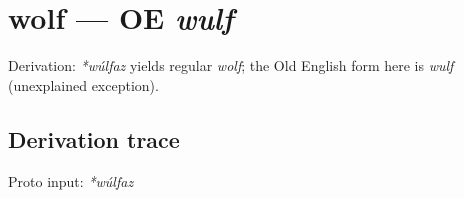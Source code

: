 \documentclass[
  british,
  a4paper,
  openany]{book}
\providecommand{\texorpdfstring}[2]{#1}
\begin{document}
\section{\texorpdfstring{wolf --- OE
\emph{wulf}}{wolf --- OE wulf}}\label{wolf-oe-wulf}


Derivation: \emph{*wúlfaz} yields regular \emph{wolf}; the Old English
form here is \emph{wulf} (unexplained exception).

\subsection{Derivation trace}\label{derivation-trace-144}

Proto input: \emph{*wúlfaz}

\begingroup
\setlength{\fboxsep}{6pt}
\end{document}
